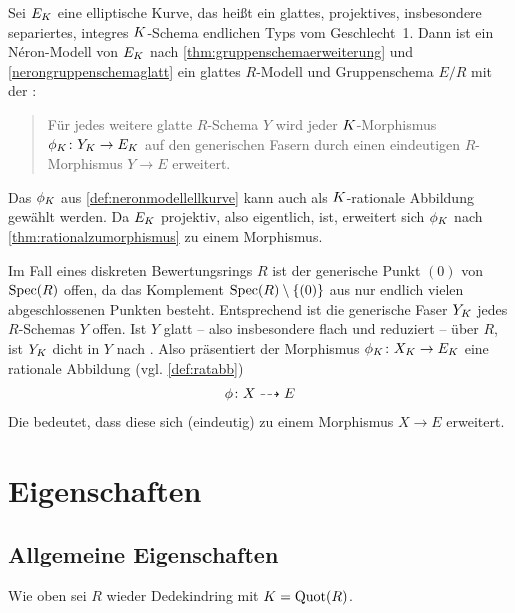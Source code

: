 
\begin{SatzDefinition}
  \label{def:neronmodellellkurve}
  Sei $E_{K}$ eine elliptische Kurve, das heißt ein
  glattes, projektives, insbesondere separiertes, integres
  $K$-Schema endlichen Typs vom Geschlecht~1.
  Dann ist ein Néron-Modell von $E_{K}$ nach
  \ref{thm:gruppenschemaerweiterung} und \ref{nerongruppenschemaglatt}
  ein glattes $R$-Modell und Gruppenschema $E/R$ mit der
  \NAbbEig:
  \begin{quote}
    Für jedes weitere glatte $R$-Schema $Y$ wird jeder
    $K$-Morphismus ${\phi_{K}\colon Y_{K}\to E_{K}}$ auf den generischen
    Fasern durch einen eindeutigen $R$-Morphismus ${Y\to E}$ erweitert.
  \end{quote}
\end{SatzDefinition}
\begin{Bemerkung}\label{thm:dichtefaser}
  Das $\phi_{K}$ aus \ref{def:neronmodellellkurve} kann auch als
  $K$-rationale Abbildung gewählt werden. Da $E_{K}$ projektiv, also
  eigentlich, ist, erweitert sich $\phi_{K}$ nach
  \ref{thm:rationalzumorphismus} zu einem Morphismus.

  Im Fall eines diskreten Bewertungsrings $R$ ist der generische Punkt
  $(0)$ von $\operatorname{Spec}(R)$ offen, da das Komplement
  $\operatorname{Spec}(R)\setminus\{(0)\}$ aus nur endlich vielen abgeschlossenen
  Punkten besteht. Entsprechend ist die generische Faser $Y_{K}$ jedes
  $R$-Schemas $Y$ offen.
  Ist $Y$ glatt – also insbesondere flach und reduziert – über $R$,
  ist $Y_{K}$ dicht in $Y$ nach \cite[Proposition~III.9.7]{hartshorne}.
  Also präsentiert der Morphismus ${\phi_{K}\colon X_{K}\to E_{K}}$ eine
  rationale Abbildung (vgl. \ref{def:ratabb})
  \begin{gather*}
    \phi\colon X\dashrightarrow E
  \end{gather*}
  Die \NAbbEig bedeutet, dass diese sich (eindeutig) zu einem
  Morphismus $X\to E$ erweitert.
\end{Bemerkung}


\section{Eigenschaften}
\subsection{Allgemeine Eigenschaften}
Wie oben sei $R$ wieder Dedekindring mit $K=\operatorname{Quot}(R)$.


